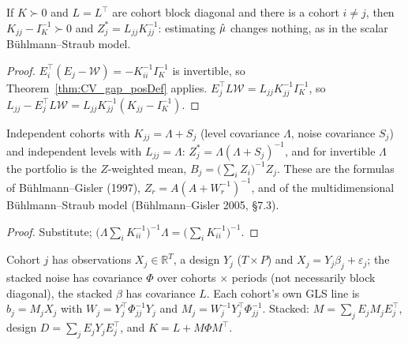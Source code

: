 \begin{theorem}[Independent cohorts: $Z_j = L_{jj}K_{jj}^{-1}$]\label{thm:CV_bestZ_blockDiag}
  \leanok
  If $K \succ 0$ and $L = L^\top$ are cohort block diagonal and there is a cohort $i \ne j$,
  then $K_{jj} - I_K^{-1} \succ 0$ and $Z_j^\ast = L_{jj} K_{jj}^{-1}$: estimating $\hat\mu$
  changes nothing, as in the scalar Bühlmann--Straub model.
\end{theorem}
\begin{proof}
  \leanok
  $E_i^\top(E_j - \mathcal W) = -K_{ii}^{-1}I_K^{-1}$ is invertible, so
  Theorem~\ref{thm:CV_gap_posDef} applies. $E_j^\top L\mathcal W = L_{jj}K_{jj}^{-1}I_K^{-1}$,
  so $L_{jj} - E_j^\top L\mathcal W = L_{jj}K_{jj}^{-1}(K_{jj} - I_K^{-1})$.
\end{proof}

\begin{theorem}\label{thm:CV_buhlmannGisler}
  \leanok
  Independent cohorts with $K_{jj} = \Lambda + S_j$ (level covariance $\Lambda$, noise
  covariance $S_j$) and independent levels with $L_{jj} = \Lambda$:
  $Z_j^\ast = \Lambda(\Lambda + S_j)^{-1}$, and for invertible $\Lambda$ the portfolio is the
  $Z$-weighted mean, $B_j = \bigl(\sum_i Z_i\bigr)^{-1} Z_j$. These are the formulas of
  Bühlmann--Gisler (1997), $Z_r = A(A + W_r^{-1})^{-1}$, and of the multidimensional
  Bühlmann--Straub model (Bühlmann--Gisler 2005, \S7.3).
\end{theorem}
\begin{proof}
  \leanok
  Substitute; $\bigl(\Lambda\sum_i K_{ii}^{-1}\bigr)^{-1}\Lambda = \bigl(\sum_i K_{ii}^{-1}\bigr)^{-1}$.
\end{proof}

\begin{definition}\label{def:CV_hach}
  \leanok
  Cohort $j$ has observations $X_j \in \mathbb{R}^T$, a design $Y_j$ ($T \times P$) and
  $X_j = Y_j\beta_j + \varepsilon_j$; the stacked noise has covariance $\Phi$ over
  cohorts $\times$ periods (not necessarily block diagonal), the stacked $\beta$ has
  covariance $L$. Each cohort's own GLS line is $b_j = M_jX_j$ with
  $W_j = Y_j^\top\Phi_{jj}^{-1}Y_j$ and $M_j = W_j^{-1}Y_j^\top\Phi_{jj}^{-1}$. Stacked:
  $M = \sum_j E_jM_jE_j^\top$, design $D = \sum_j E_jY_jE_j^\top$, and
  $K = L + M\Phi M^\top$.
\end{definition}

